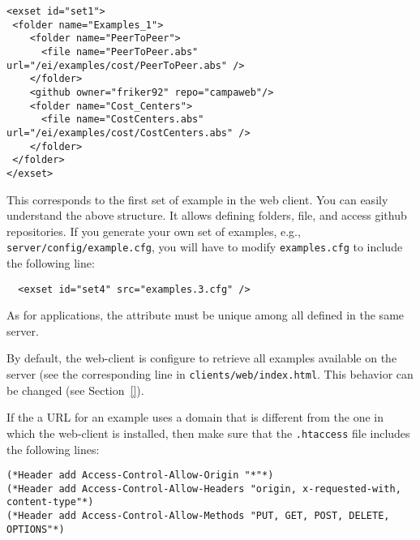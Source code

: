 \medskip
\begin{lstlisting}
<exset id="set1">
 <folder name="Examples_1">
    <folder name="PeerToPeer">
      <file name="PeerToPeer.abs" url="/ei/examples/cost/PeerToPeer.abs" />
    </folder>
    <github owner="friker92" repo="campaweb"/>
    <folder name="Cost_Centers">
      <file name="CostCenters.abs" url="/ei/examples/cost/CostCenters.abs" />
    </folder>
 </folder>
</exset>
\end{lstlisting}

\medskip
\noindent
This corresponds to the first set of example in the web client. You
can easily understand the above structure. It allows defining folders,
file, and access github repositories. If you generate your own set of
examples, e.g., \texttt{server/config/example.cfg}, you will have to
modify \texttt{examples.cfg} to include the following line:

\medskip
\begin{lstlisting}
  <exset id="set4" src="examples.3.cfg" />
\end{lstlisting}

\medskip
\indent
As for applications, the  attribute must be unique among all
 defined in the same server.

By default, the web-client is configure to retrieve all examples
available on the server (see the corresponding line in
\texttt{clients/web/index.html}. This behavior can be changed (see
Section~\ref{}).

If the a URL for an example uses a domain that is different from the
one in which the web-client is installed, then make sure that the
\texttt{.htaccess} file includes the following lines:

\begin{lstlisting}
(*Header add Access-Control-Allow-Origin "*"*)
(*Header add Access-Control-Allow-Headers "origin, x-requested-with, content-type"*)
(*Header add Access-Control-Allow-Methods "PUT, GET, POST, DELETE, OPTIONS"*)
\end{lstlisting}

